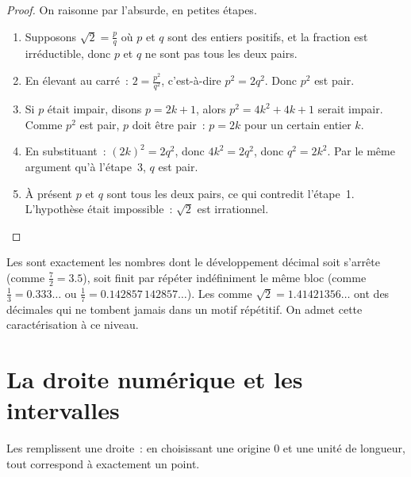 \begin{proof}
On raisonne par l'absurde, en petites étapes.
\begin{enumerate}
  \item Supposons $\sqrt 2 = \frac{p}{q}$ où $p$ et $q$ sont des
        entiers positifs, et la fraction est irréductible, donc $p$ et
        $q$ ne sont pas tous les deux pairs.
  \item En élevant au carré~: $2 = \frac{p^2}{q^2}$, c'est-à-dire
        $p^2 = 2q^2$. Donc $p^2$ est pair.
  \item Si $p$ était impair, disons $p = 2k+1$, alors
        $p^2 = 4k^2 + 4k + 1$ serait impair. Comme $p^2$ est pair,
        $p$ doit être pair~: $p = 2k$ pour un certain entier $k$.
  \item En substituant~: $(2k)^2 = 2q^2$, donc $4k^2 = 2q^2$, donc
        $q^2 = 2k^2$. Par le même argument qu'à l'étape~3, $q$ est
        pair.
  \item À présent $p$ et $q$ sont tous les deux pairs, ce qui
        contredit l'étape~1. L'hypothèse était impossible~: $\sqrt 2$
        est irrationnel.
\end{enumerate}
\end{proof}

\begin{remark}
Les  sont exactement les nombres dont le
développement décimal soit s'arrête (comme $\frac72 = 3.5$), soit finit
par répéter indéfiniment le même bloc (comme $\frac13 = 0.333\dots$ ou
$\frac{1}{7} = 0.142857\,142857\dots$). Les  comme
$\sqrt2 = 1.41421356\dots$ ont des décimales qui ne tombent jamais
dans un motif répétitif. On admet cette caractérisation à ce niveau.
\end{remark}

\section{La droite numérique et les intervalles}

Les  remplissent une droite~: en choisissant une origine
$0$ et une unité de longueur, tout  correspond à exactement
un point.

